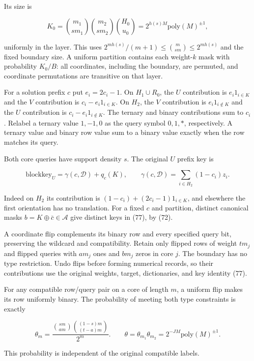 Its size is

\[
K_0=\binom{m_1}{sm_1}\binom{m_2}{sm_2}\binom{H_0}{u_0}
=2^{h(s)M}\mathrm{poly}(M)^{\pm1},
\tag{76}
\]

uniformly in the layer. This uses \(2^{mh(s)}/(m+1)\le\binom m{sm}\le2^{mh(s)}\) and the fixed boundary size. A uniform partition contains each weight-\(k\) mask with probability \(K_0/B\): all coordinates, including the boundary, are permuted, and coordinate permutations are transitive on that layer.

For a solution prefix \(c\) put \(e_i=2c_i-1\). On \(H_1\cup R_0\), the \(U\) contribution is \(e_i1_{i\in K}\) and the \(V\) contribution is \(c_i-e_i1_{i\in K}\). On \(H_2\), the \(V\) contribution is \(e_i1_{i\notin K}\) and the \(U\) contribution is \(c_i-e_i1_{i\notin K}\). The ternary and binary contributions sum to \(c_i\). Relabel a ternary value \(1,-1,0\) as the query symbol \(0,1,*\), respectively. A ternary value and binary row value sum to a binary value exactly when the row matches its query.

Both core queries have support density \(s\). The original \(U\) prefix key is

\[
\mathrm{blockkey}_U=\gamma(c,\mathcal D)+q_c(K),
\qquad
\gamma(c,\mathcal D)=\sum_{i\in H_2}(1-c_i)z_i.
\tag{77}
\]

Indeed on \(H_2\) its contribution is \((1-c_i)+(2c_i-1)1_{i\in K}\), and elsewhere the first orientation has no translation. For a fixed \(c\) and partition, distinct canonical masks \(b=K\oplus\bar c\in\mathcal A\) give distinct keys in (77), by (72).

A coordinate flip complements its binary row and every specified query bit, preserving the wildcard and compatibility. Retain only flipped rows of weight \(tm_j\) and flipped queries with \(am_j\) ones and \(bm_j\) zeros in core \(j\). The boundary has no type restriction. Undo flips before forming numerical records, so their contributions use the original weights, target, dictionaries, and key identity (77).

For any compatible row/query pair on a core of length \(m\), a uniform flip makes its row uniformly binary. The probability of meeting both type constraints is exactly

\[
\theta_m=
\frac{\binom{sm}{am}\binom{(1-s)m}{(t-a)m}}{2^m}.
\qquad
\theta=\theta_{m_1}\theta_{m_2}
=2^{-JM}\mathrm{poly}(M)^{\pm1}.
\tag{78}
\]

This probability is independent of the original compatible labels.

